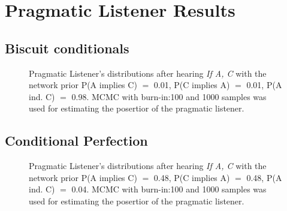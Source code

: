 \documentclass[10pt,a4paper]{article}
\author{Britta Grusdt}
\begin{document}
\section*{Pragmatic Listener Results}
\subsection*{Biscuit conditionals}
\begin{figure}[ht]
\centering
\subfloat[$P(C|A)$]{\label{fig:PL-PCgivenA}}\qquad 
\subfloat[$P(C|\neg A)$]{\label{fig:PL-PCgivenNA}}\qquad

\subfloat[$P(C)$]{\label{fig:PL-PC}}
\subfloat[$P(A|C)$]{\label{fig:PL-PAgivenC}}
 
\caption{Pragmatic Listener's distributions after hearing \textit{If A, C} with the network prior P(A implies C) $=$ 0.01, P(C implies A) $=$ 0.01, P(A ind. C) $=$ 0.98. MCMC with burn-in:100 and 1000 samples was used for estimating the posertior of the pragmatic listener.}
\label{fig:PL-biscuits}
\end{figure}

\FloatBarrier
\subsection*{Conditional Perfection}
\begin{figure}[ht]
\centering
\subfloat[$P(A|C)$]{\label{fig:PL-cp-PAgivenC}}\qquad
\subfloat[$P(C|A)$]{\label{fig:PL-cp-PCgivenA}}\qquad

\subfloat[$P(C)$]{\label{fig:PL-cp-PC}}
\caption{Pragmatic Listener's distributions after hearing \textit{If A, C} with the network prior P(A implies C) $=$ 0.48, P(C implies A) $=$ 0.48, P(A ind. C) $=$ 0.04. MCMC with burn-in:100 and 1000 samples was used for estimating the posertior of the pragmatic listener.}
\label{fig:PL-conditionalPerfection}
\end{figure}

\FloatBarrier
\end{document}
